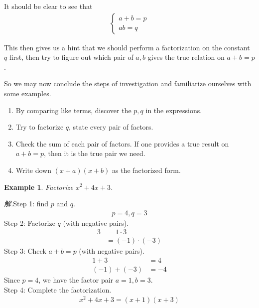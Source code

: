 \documentclass[12pt]{article}
\newtheorem{example}{Example}
\begin{document}
    It should be clear to see that \begin{align*}
        \begin{cases}
            a+b=p\\
            ab=q
        \end{cases}
    \end{align*}

    This then gives us a hint that we should perform a factorization on the constant $q$ first, then try to figure out which pair of $a,b$ gives the true relation on $a+b=p$.

    So we may now conclude the steps of investigation and familiarize ourselves with some examples.\begin{enumerate}
        \item By comparing like terms, discover the $p,q$ in the expressions.
        \item Try to factorize $q$, state every pair of factors.
        \item Check the sum of each pair of factors. If one provides a true result on $a+b=p$, then it is the true pair we need.
        \item Write down $(x+a)(x+b)$ as the factorized form.
    \end{enumerate}

    \begin{example}
        Factorize $x^2+4x+3$.
    \end{example}

    \textit{ 解.}Step 1: find $p$ and $q$.
    \begin{align*}
        p=4, q=3
    \end{align*}
    \indent \indent Step 2: Factorize $q$ (with negative pairs).
    \begin{align*}
        3&=1\cdot 3\\
        &=(-1)\cdot(-3)
    \end{align*}
    \indent \indent Step 3: Check $a+b=p$ (with negative pairs).
    \begin{align*}
        1+3&=4\\
        (-1)+(-3)&=-4
    \end{align*}
    \indent \indent \indent Since $p=4$, we have the factor pair $a=1,b=3$.\\
    \indent \indent Step 4: Complete the factorization.
    \begin{align*}
        x^2+4x+3=(x+1)(x+3)
    \end{align*}
\end{document}
